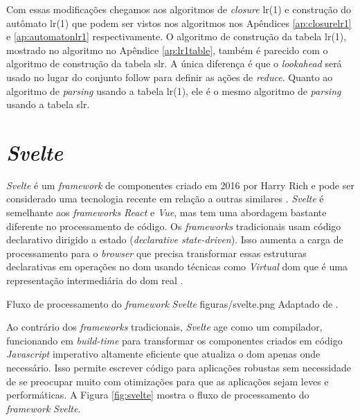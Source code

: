 Com essas modificações chegamos aos algoritmos de \textit{closure} \gls{lr}(1) e construção do autômato \gls{lr}(1) que podem ser vistos nos algoritmos nos Apêndices \ref{ap:closurelr1} e \ref{ap:automatonlr1} respectivamente. O algoritmo de construção da tabela \gls{lr}(1), mostrado no algoritmo no Apêndice \ref{ap:lr1table}, também é parecido com o algoritmo de construção da tabela \gls{slr}. A única diferença é que o \textit{lookahead} será usado no lugar do conjunto follow para definir as ações de \textit{reduce}. Quanto ao algoritmo de \textit{parsing} usando a tabela \gls{lr}(1), ele é o mesmo algoritmo de \textit{parsing} usando a tabela \gls{slr}.


\section{\textit{Svelte}}
\label{sec:svelte}

\textit{Svelte} é um \textit{framework} de componentes criado em 2016 por Harry Rich e pode ser considerado uma tecnologia recente em relação a outras similares \cite{krill_slim_2016}. \textit{Svelte} é semelhante aos \textit{frameworks} \textit{React} e \textit{Vue}, mas tem uma abordagem bastante diferente no processamento de código. Os \textit{frameworks} tradicionais usam código declarativo dirigido a estado (\textit{declarative state-driven}). Isso aumenta a carga de processamento para o \textit{browser} que precisa transformar essas estruturas declarativas em operações no \gls{dom} usando técnicas como \textit{Virtual} \gls{dom} que é uma representação intermediária do \gls{dom} real \cite{harris_svelte_2019}.

\begin{mypicture}
  {\label{fig:svelte}}
  {Fluxo de processamento do \textit{framework} \textit{Svelte}}
  {figuras/svelte.png}
  {Adaptado de \textcite{harris_svelte_2019}.}
\end{mypicture}

Ao contrário dos \textit{frameworks} tradicionais, \textit{Svelte} age como um compilador, funcionando em \textit{build-time} para transformar os componentes criados em código \textit{Javascript} imperativo altamente eficiente que atualiza o \gls{dom} apenas onde necessário. Isso permite escrever código para aplicações robustas sem necessidade de se preocupar muito com otimizações para que as aplicações sejam leves e performáticas. A Figura \ref{fig:svelte} mostra o fluxo de processamento do \textit{framework} \textit{Svelte}.

